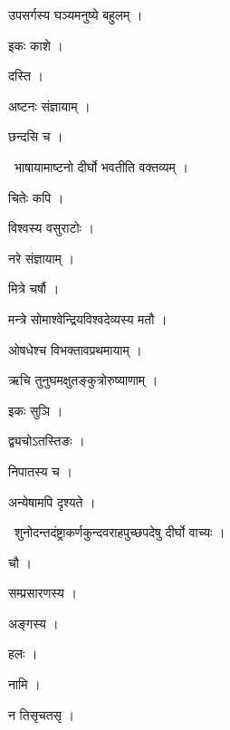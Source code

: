 \documentclass[10pt, openany, oneside]{book}
\begin{document}
\noindent उपसर्गस्य घञ्यमनुष्ये बहुलम् ।

\noindent इकः काशे ।

\noindent दस्ति ।

\noindent अष्टनः संज्ञायाम् ।

\noindent छन्दसि च ।

\par\noindent\hspace{1.5em}{\vps वा॰}~{\qt भाषायामाष्टनो दीर्घो भवतीति वक्तव्यम् ।}

\noindent चितेः कपि ।

\noindent विश्वस्य वसुराटोः ।

\noindent नरे संज्ञायाम् ।

\noindent मित्रे चर्षौ ।

\noindent मन्त्रे सोमाश्वेन्द्रियविश्वदेव्यस्य मतौ ।

\noindent ओषधेश्च विभक्तावप्रथमायाम् ।

\noindent ऋचि तुनुघमक्षुतङ्कुत्रोरुष्याणाम् ।

\noindent इकः सुञि ।

\noindent द्व्यचोऽतस्तिङः ।

\noindent निपातस्य च ।

\noindent अन्येषामपि दृश्यते ।

\par\noindent\hspace{1.5em}{\vps वा॰}~{\qt शुनोदन्तदंष्ट्राकर्णकुन्दवराहपुच्छपदेषु दीर्घो वाच्यः ।}

\noindent चौ ।

\noindent सम्प्रसारणस्य ।

\noindent अङ्गस्य ।

\noindent हलः ।

\noindent नामि ।

\noindent न तिसृचतसृ ।
\end{document}

